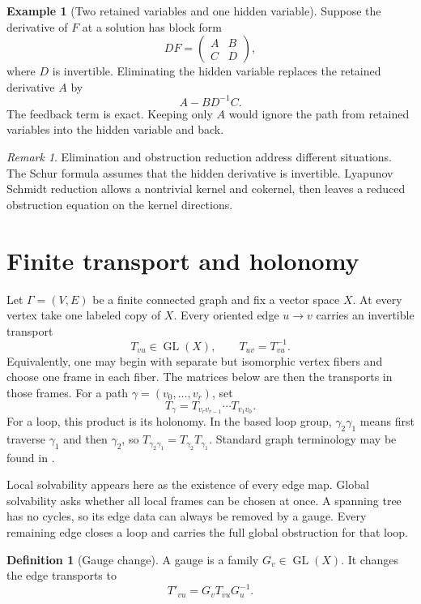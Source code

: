 \documentclass[11pt,a4paper]{article}
\theoremstyle{plain}
\theoremstyle{definition}
\newtheorem{definition}[definition]{Definition}
\newtheorem{example}[example]{Example}
\theoremstyle{remark}
\newtheorem{remark}[remark]{Remark}
\begin{document}
\begin{example}[Two retained variables and one hidden variable]\label{ex:finite_schur}
Suppose the derivative of $F$ at a solution has block form
\[
DF=
\begin{pmatrix}
A&B\\
C&D
\end{pmatrix},
\]
where $D$ is invertible.  Eliminating the hidden variable replaces the retained derivative $A$ by
\[
A-BD^{-1}C.
\]
The feedback term is exact.  Keeping only $A$ would ignore the path from retained variables into the hidden variable and back.
\end{example}

\begin{remark}\label{rem:elimination_vs_obstruction}
Elimination and obstruction reduction address different situations.  The Schur formula assumes that the hidden derivative is invertible.  Lyapunov Schmidt reduction allows a nontrivial kernel and cokernel, then leaves a reduced obstruction equation on the kernel directions.
\end{remark}

\section{Finite transport and holonomy}\label{sec:finite_holonomy}

Let $\Gamma=(V,E)$ be a finite connected graph and fix a vector space $X$.  At every vertex take one labeled copy of $X$.  Every oriented edge $u\to v$ carries an invertible transport
\[
T_{vu}\in\operatorname{GL}(X),
\qquad
T_{uv}=T_{vu}^{-1}.
\]
Equivalently, one may begin with separate but isomorphic vertex fibers and choose one frame in each fiber.  The matrices below are then the transports in those frames.  For a path $\gamma=(v_0,\ldots,v_r)$, set
\[
T_\gamma
=
T_{v_rv_{r-1}}\cdots T_{v_1v_0}.
\]
For a loop, this product is its holonomy. In the based loop group, $\gamma_2\gamma_1$ means first traverse $\gamma_1$ and then $\gamma_2$, so $T_{\gamma_2\gamma_1}=T_{\gamma_2}T_{\gamma_1}$.  Standard graph terminology may be found in \cite{GrossTucker1987}.

Local solvability appears here as the existence of every edge map.  Global solvability asks whether all local frames can be chosen at once.  A spanning tree has no cycles, so its edge data can always be removed by a gauge.  Every remaining edge closes a loop and carries the full global obstruction for that loop.

\begin{definition}[Gauge change]\label{def:gauge_change}
A gauge is a family $G_v\in\operatorname{GL}(X)$.  It changes the edge transports to
\[
T'_{vu}=G_vT_{vu}G_u^{-1}.
\]
\end{definition}
\end{document}
